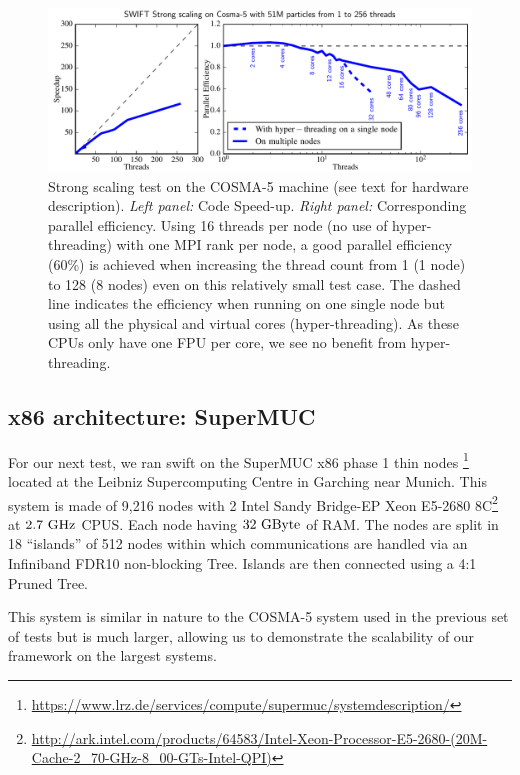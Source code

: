 \documentclass{sig-alternate-05-2015}
\newcommand{\swift}{{\sc swift}\xspace}
\begin{document}
\begin{figure}
\centering
\includegraphics[width=\textwidth]{Figures/scalingCosma}
\caption{Strong scaling test on the COSMA-5 machine (see text for hardware
  description). \textit{Left panel:} Code Speed-up. \textit{Right panel:}
  Corresponding parallel efficiency.  Using 16 threads per node (no use of
  hyper-threading) with one MPI rank per node, a good parallel efficiency (60\%)
  is achieved when increasing the thread count from 1 (1 node) to 128 (8 nodes)
  even on this relatively small test case. The dashed line indicates the
  efficiency when running on one single node but using all the physical and
  virtual cores (hyper-threading). As these CPUs only have one FPU per core, we
  see no benefit from hyper-threading.
  \label{fig:cosma}}
\end{figure}



\subsection{x86 architecture: SuperMUC}

For our next test, we ran \swift on the SuperMUC x86 phase 1 thin
nodes \footnote{\url{https://www.lrz.de/services/compute/supermuc/systemdescription/}}
located at the Leibniz Supercomputing Centre in Garching near Munich. This
system is made of 9,216 nodes with 2 Intel Sandy Bridge-EP Xeon E5-2680
8C\footnote{\url{http://ark.intel.com/products/64583/Intel-Xeon-Processor-E5-2680-(20M-Cache-2_70-GHz-8_00-GTs-Intel-QPI)}}
at $2.7~\rm{GHz}$ CPUS. Each node having $32~\rm{GByte}$ of RAM. The nodes are split in 18
``islands'' of 512 nodes within which communications are handled via an
Infiniband FDR10 non-blocking Tree. Islands are then connected using a 4:1
Pruned Tree.

This system is similar in nature to the COSMA-5 system used in the previous set
of tests but is much larger, allowing us to demonstrate the scalability of our
framework on the largest systems.
\end{document}
